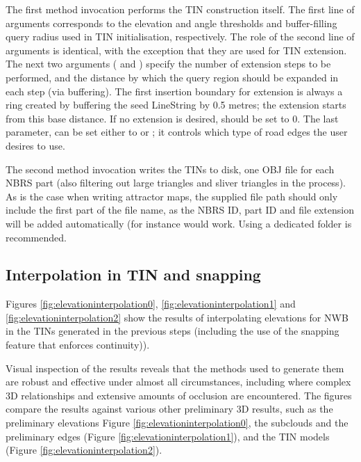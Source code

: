 The first method invocation performs the TIN construction itself. The first line of arguments corresponds to the elevation and angle thresholds and buffer-filling query radius used in TIN initialisation, respectively. The role of the second line of arguments is identical, with the exception that they are used for TIN extension. The next two arguments ( and ) specify the number of extension steps to be performed, and the distance by which the query region should be expanded in each step (via buffering). The first insertion boundary for extension is always a ring created by buffering the seed LineString by 0.5 metres; the extension starts from this base distance. If no extension is desired,  should be set to 0. The last parameter,  can be set either to  or ; it controls which type of road edges the user desires to use.

The second method invocation writes the TINs to disk, one OBJ file for each NBRS part (also filtering out large triangles and sliver triangles in the process). As is the case when writing attractor maps, the supplied file path should only include the first part of  the file name, as the NBRS ID, part ID and file extension will be added automatically (for instance  would work. Using a dedicated folder is recommended.

\subsection{Interpolation in TIN and snapping}
\label{sub:r_interpolation}

Figures \ref{fig:elevationinterpolation0}, \ref{fig:elevationinterpolation1} and \ref{fig:elevationinterpolation2} show the results of interpolating elevations for NWB in the TINs generated in the previous steps (including the use of the snapping feature that enforces continuity)).

Visual inspection of the results reveals that the methods used to generate them are robust and effective under almost all circumstances, including where complex 3D relationships and extensive amounts of occlusion are encountered. The figures compare the results against various other preliminary 3D results, such as the preliminary elevations Figure \ref{fig:elevationinterpolation0}, the subclouds and the preliminary edges (Figure \ref{fig:elevationinterpolation1}), and the TIN models (Figure \ref{fig:elevationinterpolation2}).

